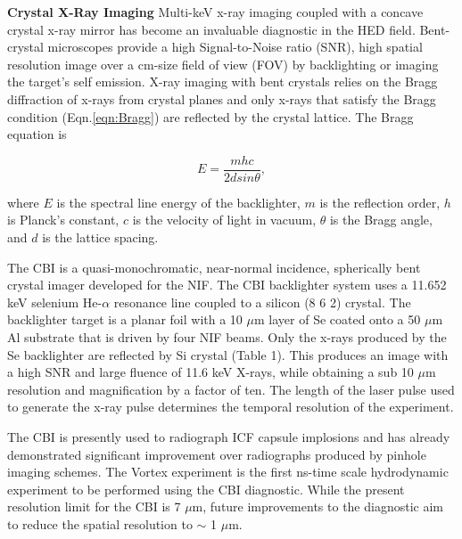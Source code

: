 \documentclass[%
 aip,
 amsmath,amssymb,
 reprint,
 floatfix
]{revtex4-1}
\begin{document}
\noindent \textbf{Crystal X-Ray Imaging}
Multi-keV x-ray imaging coupled with a concave crystal x-ray mirror has become an invaluable diagnostic in the HED field.  Bent-crystal microscopes provide a high Signal-to-Noise ratio (SNR), high spatial resolution image over a cm-size field of view (FOV) by backlighting or imaging the target's self emission.  X-ray imaging with bent crystals relies on the Bragg diffraction of x-rays from crystal planes and only x-rays that satisfy the Bragg condition (Eqn.\ref{eqn:Bragg}) are reflected by the crystal lattice. The Bragg equation is 

\begin{equation}
E = \frac{mhc}{2dsin\theta},
\label{eqn:Bragg}
\end{equation}

where $E$ is the spectral line energy of the backlighter, $m$ is the reflection order, $h$ is Planck's constant, $c$ is the velocity of light in vacuum,  $\theta$ is the Bragg angle, and $d$ is the lattice spacing.   
 


The CBI is a quasi-monochromatic, near-normal incidence, spherically bent crystal imager developed for the NIF. The CBI backlighter system  uses a 11.652 keV selenium He-$\alpha$ resonance line coupled to a silicon (8 6 2) crystal. \cite{Hall:2019,schollmeier} The backlighter target is a planar foil with a 10 $\mu$m layer of Se coated onto a 50 $\mu$m Al substrate that is driven by four NIF beams. Only the x-rays produced by the Se backlighter are reflected by Si crystal (Table 1).  This produces an image with a high SNR and large fluence of 11.6 keV X-rays, while obtaining a sub 10 $\mu$m resolution and magnification by a factor of ten. \cite{Hall:2019}  The length of the laser pulse used to generate the x-ray pulse  determines the temporal resolution of the experiment.

The CBI is presently used to radiograph ICF capsule implosions and has already demonstrated significant improvement over radiographs produced by pinhole imaging schemes.  The Vortex experiment is the first ns-time scale hydrodynamic experiment to be performed using the CBI diagnostic. While the present resolution limit for the CBI is 7 $\mu$m, future improvements to the diagnostic aim to reduce the spatial resolution to $\sim$ 1 $\mu$m. 
\end{document}
